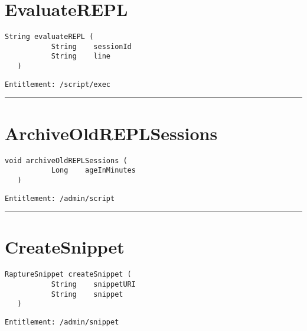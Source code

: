 \section{EvaluateREPL}
\label{Api:EvaluateREPL}
\begin{lstlisting}[style=nonumbers]
   String evaluateREPL (
           String    sessionId
           String    line
   )
\end{lstlisting}
\begin{Verbatim}[formatcom=\color{Maroon}]
  Entitlement: /script/exec
\end{Verbatim}



\rule{12cm}{2pt}
\section{ArchiveOldREPLSessions}
\label{Api:ArchiveOldREPLSessions}
\begin{lstlisting}[style=nonumbers]
   void archiveOldREPLSessions (
           Long    ageInMinutes
   )
\end{lstlisting}
\begin{Verbatim}[formatcom=\color{Maroon}]
  Entitlement: /admin/script
\end{Verbatim}



\rule{12cm}{2pt}
\section{CreateSnippet}
\label{Api:CreateSnippet}
\begin{lstlisting}[style=nonumbers]
   RaptureSnippet createSnippet (
           String    snippetURI
           String    snippet
   )
\end{lstlisting}
\begin{Verbatim}[formatcom=\color{Maroon}]
  Entitlement: /admin/snippet
\end{Verbatim}



